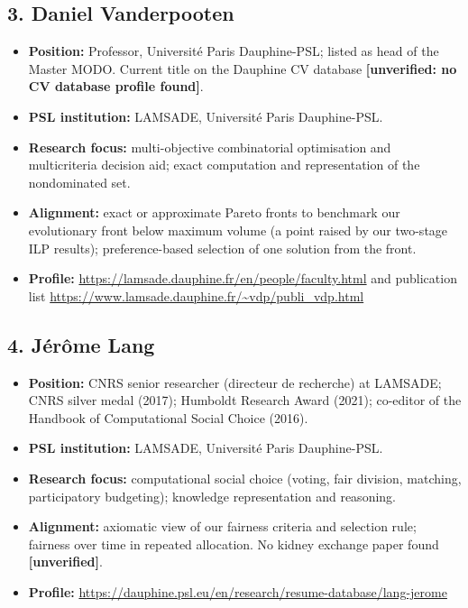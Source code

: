 \documentclass[10pt]{article}
\begin{document}
\subsection*{3. Daniel Vanderpooten}
\begin{itemize}
  \item \textbf{Position:} Professor, Universit\'e Paris Dauphine-PSL; listed as head of
        the Master MODO. Current title on the Dauphine CV database \textbf{[unverified:
        no CV database profile found]}.
  \item \textbf{PSL institution:} LAMSADE, Universit\'e Paris Dauphine-PSL.
  \item \textbf{Research focus:} multi-objective combinatorial optimisation and
        multicriteria decision aid; exact computation and representation of the
        nondominated set.
  \item \textbf{Alignment:} exact or approximate Pareto fronts to benchmark our
        evolutionary front below maximum volume (a point raised by our two-stage ILP
        results); preference-based selection of one solution from the front.
  \item \textbf{Profile:} \url{https://lamsade.dauphine.fr/en/people/faculty.html} and
        publication list \url{https://www.lamsade.dauphine.fr/~vdp/publi_vdp.html}
\end{itemize}

\subsection*{4. J\'er\^ome Lang}
\begin{itemize}
  \item \textbf{Position:} CNRS senior researcher (directeur de recherche) at LAMSADE;
        CNRS silver medal (2017); Humboldt Research Award (2021); co-editor of the
        Handbook of Computational Social Choice (2016).
  \item \textbf{PSL institution:} LAMSADE, Universit\'e Paris Dauphine-PSL.
  \item \textbf{Research focus:} computational social choice (voting, fair division,
        matching, participatory budgeting); knowledge representation and reasoning.
  \item \textbf{Alignment:} axiomatic view of our fairness criteria and selection rule;
        fairness over time in repeated allocation. No kidney exchange paper found
        \textbf{[unverified]}.
  \item \textbf{Profile:} \url{https://dauphine.psl.eu/en/research/resume-database/lang-jerome}
\end{itemize}
\end{document}
